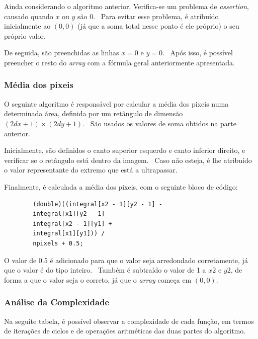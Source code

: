     \newpage

    \par Ainda considerando o algoritmo anterior, Verifica-se um problema de \textit{assertion}, causado quando $x$ ou $y$ são 0. \ Para evitar esse problema, é atribuído inicialmente ao $(0,0)$ (já que a soma total nesse ponto é ele próprio) o seu próprio valor.

    \par De seguida, são preenchidas as linhas $x = 0$ e $y = 0$. \ Após isso, é possível preencher o resto do \textit{array} com a fórmula geral anteriormente apresentada.

\subsubsection{Média dos pixeis}
    \par O seguinte algoritmo é responsável por calcular a média dos pixeis numa determinada área, definida por um retângulo de dimensão $(2dx + 1) \times (2dy + 1)$. \ São usados os valores de soma obtidos na parte anterior.

    \par Inicialmente, são definidos o canto superior esquerdo e canto inferior direito, e verificar se o retângulo está dentro da imagem. \ Caso não esteja, é lhe atribuído o valor representante do extremo que está a ultrapassar.

    \par Finalmente, é calculada a média dos pixeis, com o seguinte bloco de código:

    \begin{lstlisting}
        (double)((integral[x2 - 1][y2 - 1] -
        integral[x1][y2 - 1] -
        integral[x2 - 1][y1] +
        integral[x1][y1])) /
        npixels + 0.5;
    \end{lstlisting}

    \par O valor de 0.5 é adicionado para que o valor seja arredondado corretamente, já que o valor é do tipo inteiro. \ Também é subtraído o valor de 1 a $x2$ e $y2$, de forma a que o valor seja o correto, já que o \textit{array} começa em $(0,0)$.

\subsubsection{Análise da Complexidade}
    \par Na seguite tabela, é possível observar a complexidade de cada função, em termos de iterações de ciclos e de operações aritméticas das duas partes do algoritmo.

